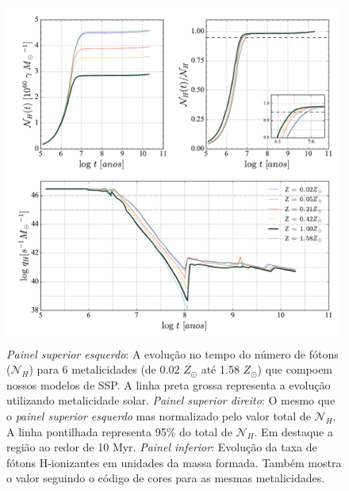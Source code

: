 \begin{figure}
	\centering
	\includegraphics[scale=0.62]{figuras/Nh_logt_metBase_Padova2000_salp.pdf}
	\caption[Evolução temporal do número de fótons H-ionizantes e da taxa de fótons H-ionizantes em
unidades da massa formada.] 
	{\emph{Painel superior esquerdo}: A	evolução no tempo do número de fótons ($\mathcal{N}_H$) para 6
metalicidades (de 0.02 $Z_\odot$ até 1.58 $Z_\odot$) que compoem nossos modelos de SSP. A linha
preta grossa representa a evolução utilizando metalicidade solar. \emph{Painel superior direito}:
O mesmo que o \emph{painel superior esquerdo} mas normalizado pelo valor total de $\mathcal{N}_H$.
A linha pontilhada representa 95\% do total de $\mathcal{N}_H$. Em destaque a região ao redor de 10
Myr. \emph{Painel inferior}: Evolução da taxa de fótons H-ionizantes em unidades da massa formada.
Também mostra o valor seguindo o código de cores para as mesmas metalicidades.}
	\label{fig:Nh_qh}
\end{figure}
 
